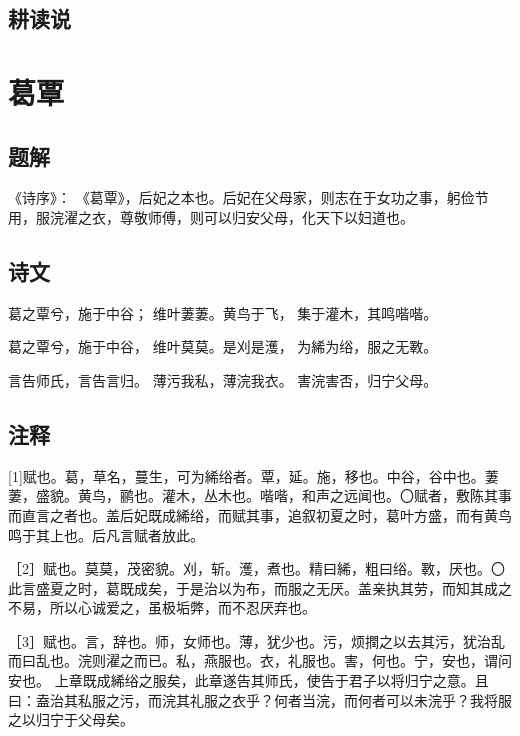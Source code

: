 \documentclass[
]{book}
\theoremstyle{definition}
\theoremstyle{definition}
\theoremstyle{definition}
\theoremstyle{definition}
\theoremstyle{remark}
\begin{document}
\hypertarget{ux8015ux8bfbux8bf4}{%
\subsection{耕读说}\label{ux8015ux8bfbux8bf4}}

\hypertarget{ux845bux8983}{%
\section{葛覃}\label{ux845bux8983}}

\hypertarget{ux9898ux89e3-1}{%
\subsection{题解}\label{ux9898ux89e3-1}}

《诗序》：
《葛覃》，后妃之本也。后妃在父母家，则志在于女功之事，躬俭节用，服浣濯之衣，尊敬师傅，则可以归安父母，化天下以妇道也。

\hypertarget{ux8bd7ux6587-1}{%
\subsection{诗文}\label{ux8bd7ux6587-1}}

葛之覃兮，施于中谷；
维叶萋萋。黄鸟于飞，
集于灌木，其鸣喈喈。

葛之覃兮，施于中谷，
维叶莫莫。是刈是濩，
为絺为绤，服之无斁。

言告师氏，言告言归。
薄污我私，薄浣我衣。
害浣害否，归宁父母。

\hypertarget{ux6ce8ux91ca-1}{%
\subsection{注释}\label{ux6ce8ux91ca-1}}

{[}1{]}赋也。葛，草名，蔓生，可为絺绤者。覃，延。施，移也。中谷，谷中也。萋萋，盛貌。黄鸟，鹂也。灌木，丛木也。喈喈，和声之远闻也。〇赋者，敷陈其事而直言之者也。盖后妃既成絺绤，而赋其事，追叙初夏之时，葛叶方盛，而有黄鸟鸣于其上也。后凡言赋者放此。

［2］赋也。莫莫，茂密貌。刈，斩。濩，煮也。精曰絺，粗曰绤。斁，厌也。〇此言盛夏之时，葛既成矣，于是治以为布，而服之无厌。盖亲执其劳，而知其成之不易，所以心诚爱之，虽极垢弊，而不忍厌弃也。

［3］赋也。言，辞也。师，女师也。薄，犹少也。污，烦撋之以去其污，犹治乱而曰乱也。浣则濯之而已。私，燕服也。衣，礼服也。害，何也。宁，安也，谓问安也。
上章既成絺绤之服矣，此章遂告其师氏，使告于君子以将归宁之意。且曰：盍治其私服之污，而浣其礼服之衣乎？何者当浣，而何者可以未浣乎？我将服之以归宁于父母矣。
\end{document}
